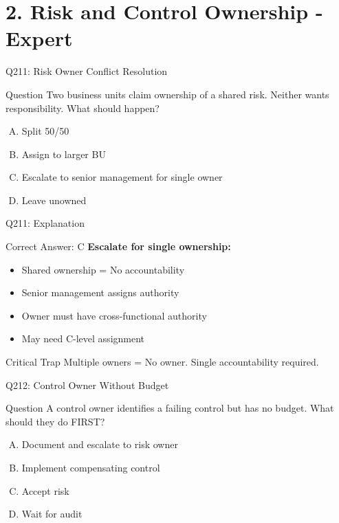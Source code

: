 \documentclass{beamer}
\begin{document}
	
	\section{2. Risk and Control Ownership - Expert}
	
	\begin{frame}{Q211: Risk Owner Conflict Resolution}
		\begin{block}{Question}
			Two business units claim ownership of a shared risk. Neither wants responsibility. What should happen?
		\end{block}
		\begin{enumerate}[(A)]
			\item Split 50/50
			\item Assign to larger BU
			\item Escalate to senior management for single owner
			\item Leave unowned
		\end{enumerate}
	\end{frame}
	
	\begin{frame}{Q211: Explanation}
		\begin{block}{Correct Answer: C}
			\textbf{Escalate for single ownership:}
			\begin{itemize}
				\item Shared ownership = No accountability
				\item Senior management assigns authority
				\item Owner must have cross-functional authority
				\item May need C-level assignment
			\end{itemize}
		\end{block}
		\begin{alertblock}{Critical Trap}
			Multiple owners = No owner.
			Single accountability required.
		\end{alertblock}
	\end{frame}
	
	\begin{frame}{Q212: Control Owner Without Budget}
		\begin{block}{Question}
			A control owner identifies a failing control but has no budget. What should they do FIRST?
		\end{block}
		\begin{enumerate}[(A)]
			\item Document and escalate to risk owner
			\item Implement compensating control
			\item Accept risk
			\item Wait for audit
		\end{enumerate}
	\end{frame}
	
\end{document}

